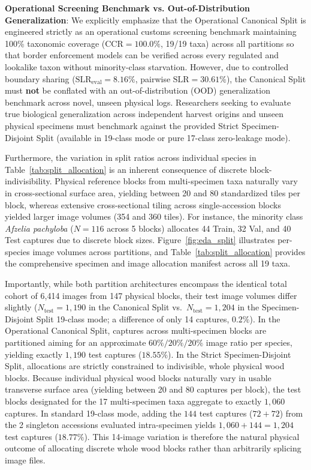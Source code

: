 \documentclass[a4paper,fleqn,12pt]{cas-sc}
\begin{document}
\noindent
\textbf{Operational Screening Benchmark vs. Out-of-Distribution Generalization}:
We explicitly emphasize that the Operational Canonical Split is engineered strictly as an operational customs screening benchmark maintaining 100\% taxonomic coverage ($\text{CCR} = 100.0\%$, 19/19 taxa) across all partitions so that border enforcement models can be verified across every regulated and lookalike taxon without minority-class starvation. However, due to controlled boundary sharing ($\text{SLR}_{\text{eval}} = 8.16\%$, pairwise $\text{SLR} = 30.61\%$), the Canonical Split must \textbf{not} be conflated with an out-of-distribution (OOD) generalization benchmark across novel, unseen physical logs. Researchers seeking to evaluate true biological generalization across independent harvest origins and unseen physical specimens must benchmark against the provided Strict Specimen-Disjoint Split (available in 19-class mode or pure 17-class zero-leakage mode).

Furthermore, the variation in split ratios across individual species in Table~\ref{tab:split_allocation} is an inherent consequence of discrete block-indivisibility. Physical reference blocks from multi-specimen taxa naturally vary in cross-sectional surface area, yielding between 20 and 80 standardized tiles per block, whereas extensive cross-sectional tiling across single-accession blocks yielded larger image volumes (354 and 360 tiles). For instance, the minority class \textit{Afzelia pachyloba} ($N=116$ across 5 blocks) allocates 44 Train, 32 Val, and 40 Test captures due to discrete block sizes. Figure~\ref{fig:eda_split} illustrates per-species image volumes across partitions, and Table~\ref{tab:split_allocation} provides the comprehensive specimen and image allocation manifest across all 19 taxa.

Importantly, while both partition architectures encompass the identical total cohort of 6,414 images from 147 physical blocks, their test image volumes differ slightly ($N_{\text{test}} = 1{,}190$ in the Canonical Split vs.\ $N_{\text{test}} = 1{,}204$ in the Specimen-Disjoint Split 19-class mode; a difference of only 14 captures, $0.2\%$). In the Operational Canonical Split, captures across multi-specimen blocks are partitioned aiming for an approximate $60\%/20\%/20\%$ image ratio per species, yielding exactly $1{,}190$ test captures ($18.55\%$). In the Strict Specimen-Disjoint Split, allocations are strictly constrained to indivisible, whole physical wood blocks. Because individual physical wood blocks naturally vary in usable transverse surface area (yielding between 20 and 80 captures per block), the test blocks designated for the 17 multi-specimen taxa aggregate to exactly $1{,}060$ captures. In standard 19-class mode, adding the $144$ test captures ($72 + 72$) from the 2 singleton accessions evaluated intra-specimen yields $1{,}060 + 144 = 1{,}204$ test captures ($18.77\%$). This 14-image variation is therefore the natural physical outcome of allocating discrete whole wood blocks rather than arbitrarily splicing image files.
\end{document}
